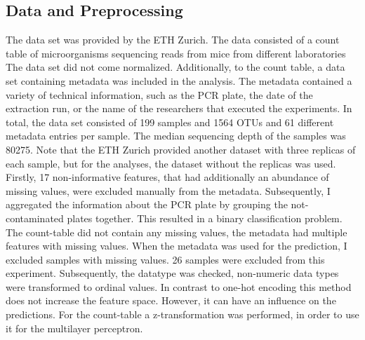 \documentclass{svproc}
\begin{document}
\subsection{Data and Preprocessing}

The data set was provided by the ETH Zurich. The data consisted of a count table of microorganisms sequencing reads from mice from different laboratories The data set did not come normalized. Additionally, to the count table, a data set containing metadata was included in the analysis. The metadata contained a variety of technical information, such as the PCR plate, the date of the extraction run, or the name of the researchers that executed the experiments. In total, the data set consisted of 199 samples and 1564 OTUs and 61 different metadata entries per sample. The median sequencing depth of the samples was 80275. Note that the ETH Zurich provided another dataset with three replicas of each sample, but for the analyses, the dataset without the replicas was used.\\
Firstly, 17 non-informative features, that had additionally an abundance of missing values, were excluded manually from the metadata. Subsequently, I aggregated the information about the PCR plate by grouping the not-contaminated plates together. This resulted in a binary classification problem. The count-table did not contain any missing values, the metadata had multiple features with missing values. When the metadata was used for the prediction, I excluded samples with missing values. 26 samples were excluded from this experiment. Subsequently, the datatype was checked, non-numeric data types were transformed to ordinal values. In contrast to one-hot encoding this method does not increase the feature space. However, it can have an influence on the predictions. 
For the count-table a z-transformation was performed, in order to use it for the multilayer perceptron.
\end{document}
